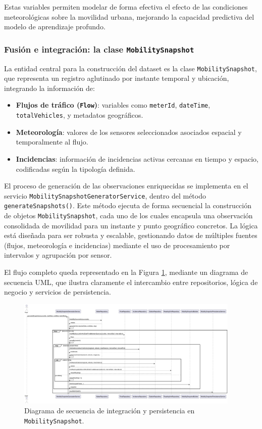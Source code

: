 Estas variables permiten modelar de forma efectiva el efecto de las condiciones meteorológicas sobre la movilidad urbana, mejorando la capacidad predictiva del modelo de aprendizaje profundo.

\subsubsection*{Fusión e integración: la clase \texttt{MobilitySnapshot}}

La entidad central para la construcción del dataset es la clase \texttt{MobilitySnapshot}, que representa un registro aglutinado por instante temporal y ubicación, integrando la información de:

\begin{itemize}
	\item \textbf{Flujos de tráfico (\texttt{Flow})}: variables como \texttt{meterId}, \texttt{dateTime}, \texttt{totalVehicles}, y metadatos geográficos.
	\item \textbf{Meteorología}: valores de los sensores seleccionados asociados espacial y temporalmente al flujo.
	\item \textbf{Incidencias}: información de incidencias activas cercanas en tiempo y espacio, codificadas según la tipología definida.
\end{itemize}

El proceso de generación de las observaciones enriquecidas se implementa en el servicio \texttt{MobilitySnapshotGeneratorService}, dentro del método \texttt{generateSnapshots()}. Este método ejecuta de forma secuencial la construcción de objetos \texttt{MobilitySnapshot}, cada uno de los cuales encapsula una observación consolidada de movilidad para un instante y punto geográfico concretos. La lógica está diseñada para ser robusta y escalable, gestionando datos de múltiples fuentes (flujos, meteorología e incidencias) mediante el uso de procesamiento por intervalos y agrupación por sensor.

El flujo completo queda representado en la Figura \ref{fig:sequence_mobility_snapshot}, mediante un diagrama de secuencia UML, que ilustra claramente el intercambio entre repositorios, lógica de negocio y servicios de persistencia.

\begin{figure}[H]
	\centering
	\includegraphics[width=0.95\textwidth]{includes/snapshot_generator_sequence.png}
	\caption{Diagrama de secuencia de integración y persistencia en \texttt{MobilitySnapshot}.}
	\label{fig:sequence_mobility_snapshot}
\end{figure}

